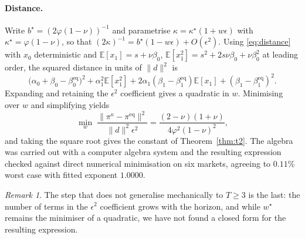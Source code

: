 \documentclass[11pt,a4paper]{article}
\theoremstyle{plain}
\theoremstyle{definition}
\theoremstyle{remark}
\newtheorem{remark}[theorem]{Remark}
\newcommand{\E}{\mathbb{E}}
\newcommand{\pieq}{\pi^{\mathrm{eq}}}
\newcommand{\pir}{\pi^{\kappa}}
\begin{document}
\paragraph{Distance.} Write $b^{\star}=(2\varphi(1-\nu))^{-1}$ and parametrise
$\kappa=\kappa^{\star}(1+w\epsilon)$ with $\kappa^{\star}=\varphi(1-\nu)$, so
that $(2\kappa)^{-1}=b^{\star}(1-w\epsilon)+O(\epsilon^2)$. Using
\eqref{eq:distance} with $x_0$ deterministic and
$\E[x_1]=s+\nu\beta_0$, $\E[x_1^2]=s^2+2s\nu\beta_0+\nu\beta_0^2$ at leading
order, the squared distance in units of $\|d\|^{2}$ is
\[
\bigl(\alpha_0+\beta_0-\beta^{\mathrm{eq}}_0\bigr)^{2}
+\alpha_1^{2}\E[x_1^{2}]+2\alpha_1(\beta_1-\beta^{\mathrm{eq}}_1)\E[x_1]
+(\beta_1-\beta^{\mathrm{eq}}_1)^{2}.
\]
Expanding and retaining the $\epsilon^{2}$ coefficient gives a quadratic in $w$.
Minimising over $w$ and simplifying yields
\[
\min_{w}\;\frac{\|\pir-\pieq\|^{2}}{\|d\|^{2}\epsilon^{2}}
=\frac{(2-\nu)(1+\nu)}{4\varphi^{2}(1-\nu)^{2}},
\]
and taking the square root gives the constant of Theorem~\ref{thm:t2}. The
algebra was carried out with a computer algebra system and the resulting
expression checked against direct numerical minimisation on six markets,
agreeing to $0.11\%$ worst case with fitted exponent $1.0000$.

\begin{remark}
The step that does not generalise mechanically to $T\ge3$ is the last: the
number of terms in the $\epsilon^{2}$ coefficient grows with the horizon, and
while $w^{\star}$ remains the minimiser of a quadratic, we have not found a
closed form for the resulting expression.
\end{remark}
\end{document}
